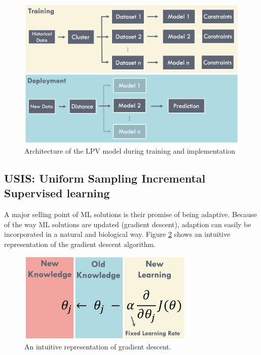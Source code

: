 \begin{figure}[h]
    \centering
    \includegraphics[width=\textwidth]{images/ch2/02lpv_architecture.jpeg}
    \caption{Architecture of the LPV model during training and implementation}
    \label{fig:02lpv_architecture}
\end{figure}

\subsection{USIS: Uniform Sampling Incremental Supervised learning}
A major selling point of ML solutions is their promise of being adaptive. Because of the way ML solutions are updated (gradient descent), adaption can easily be incorporated in a natural and biological way. Figure \ref{fig:02GradDesc} shows an intuitive representation of the gradient descent algorithm.

\begin{figure}[h]
    \centering
    \includegraphics[width=0.75\textwidth]{images/ch2/02GradDesc}
    \caption{An intuitive representation of gradient descent.}
    \label{fig:02GradDesc}
\end{figure}

